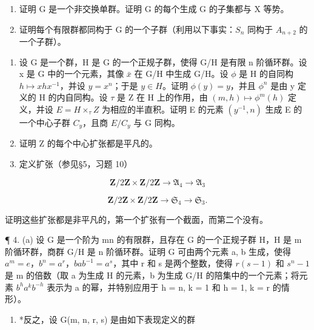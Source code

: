 \begin{enumerate}
\def\labelenumi{(\alph{enumi})}
\item
  证明 G 是一个非交换单群。证明 G 的每个生成 G 的子集都与 X 等势。
\item
  证明每个有限群都同构于 G 的一个子群（利用以下事实：\(S_{n}\) 同构于 \(A_{n+2}\) 的一个子群）。
\end{enumerate}

\BourbakiExercisesSection

\begin{enumerate}
\def\labelenumi{\arabic{enumi}。}
\item
  设 G 是一个群，H 是 G 的一个正规子群，使得 G/H 是有限 n 阶循环群。设 x 是 G 中的一个元素，其像 \(\bar{x}\) 在 G/H 中生成 G/H。设 \(\phi\) 是 H 的自同构 \(h \mapsto xhx^{-1}\)，并设 \(y = x^{n}\)；于是 \(y \in H\)。证明 \(\phi(y) = y\)，并且 \(\phi^{n}\) 是由 y 定义的 H 的内自同构。设 \(\tau\) 是 Z 在 H 上的作用，由 \((m, h) \mapsto \phi^{m}(h)\) 定义，并设 \(E = H \times_{\tau} Z\) 为相应的半直积。证明 E 的元素 \((y^{-1}, n)\) 生成 E 的一个中心子群 \(C_{y}\)，且商 \(E/C_{y}\) 与 G 同构。
\item
  证明 Z 的每个中心扩张都是平凡的。
\item
  定义扩张（参见§5，习题 10）
\end{enumerate}

\[
\mathbf {Z} / 2 \mathbf {Z} \times \mathbf {Z} / 2 \mathbf {Z} \rightarrow \mathfrak {A} _ {4} \rightarrow \mathfrak {A} _ {3}
\]

\[
\mathbf {Z} / 2 \mathbf {Z} \times \mathbf {Z} / 2 \mathbf {Z} \rightarrow \mathfrak {S} _ {4} \rightarrow \mathfrak {S} _ {3}.
\]

证明这些扩张都是非平凡的，第一个扩张有一个截面，而第二个没有。

¶ 4. (a) 设 G 是一个阶为 mn 的有限群，且存在 G 的一个正规子群 H，H 是 m 阶循环群，商群 G/H 是 n 阶循环群。证明 G 可由两个元素 a, b 生成，使得 \(a^{m} = e\)，\(b^{n} = a^{r}\)，\(bab^{-1} = a^{s}\)，其中 r 和 s 是两个整数，使得 \(r(s - 1)\) 和 \(s^{n} - 1\) 是 m 的倍数（取 a 为生成 H 的元素，b 为生成 G/H 的陪集中的一个元素；将元素 \(b^{h}a^{k}b^{-h}\) 表示为 a 的幂，并特别应用于 h = n, k = 1 和 h = 1, k = r 的情形）。

\begin{enumerate}
\def\labelenumi{(\alph{enumi})}
\setcounter{enumi}{1}
\tightlist
\item
  *反之，设 G(m, n, r, s) 是由如下表现定义的群
\end{enumerate}

